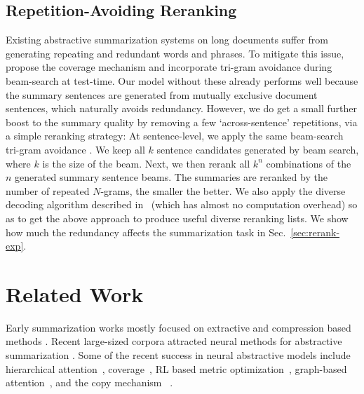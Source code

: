 \documentclass[11pt,a4paper]{article}
\def\secref#1{Sec.~\ref{#1}}
\begin{document}
\subsection{Repetition-Avoiding Reranking}
\label{sec:rerank}
Existing abstractive summarization systems on long documents suffer from generating repeating and redundant words and phrases.
To mitigate this issue, \citet{get_to_the_point} propose the coverage mechanism and \citet{DBLP:journals/corr/PaulusXS17} incorporate tri-gram avoidance during beam-search at test-time.
Our model without these already performs well because the summary sentences are generated from mutually exclusive document sentences, which naturally avoids redundancy.
However, we do get a small further boost to the summary quality by removing a few `across-sentence' repetitions, via a simple reranking strategy: At sentence-level, we apply the same beam-search tri-gram avoidance \citep{DBLP:journals/corr/PaulusXS17}.
We keep all $k$ sentence candidates generated by beam search, where $k$ is the size of the beam.
Next, we then rerank all $k^n$ combinations of the $n$ generated summary sentence beams.
The summaries are reranked by the number of repeated $N$-grams, the smaller the better.
We also apply the diverse decoding algorithm described in~ (which has almost no computation overhead) so as to get the above approach to produce useful diverse reranking lists. 
We show how much the redundancy affects the summarization task in \secref{sec:rerank-exp}.

 
\section{Related Work}
Early summarization works mostly focused on extractive and compression based methods
\citep{Jing:2000:CPB:974305.974329,Knight:2000:SSS:647288.721086,Clarke:Lapata:2010,Berg-Kirkpatrick:2011:JLE:2002472.2002534,filippova:43852}.
Recent large-sized corpora attracted neural methods for abstractive summarization
\citep{rush-chopra-weston:2015:EMNLP,chopra-auli-rush:2016:N16-1}.
Some of the recent success in neural abstractive models include hierarchical attention~\cite{nallapati2016abstractive},
coverage~\cite{Suzuki2016Summ,Chen2016DistractionBasedNN,get_to_the_point}, RL based metric optimization~\cite{DBLP:journals/corr/PaulusXS17}, graph-based attention~\cite{graph_attn_Tan2017AbstractiveDS}, and the copy mechanism~ \cite{DBLP:journals/corr/MiaoB16,gu-EtAl:2016:P16-1:copying_mechanism,get_to_the_point}.
\end{document}
